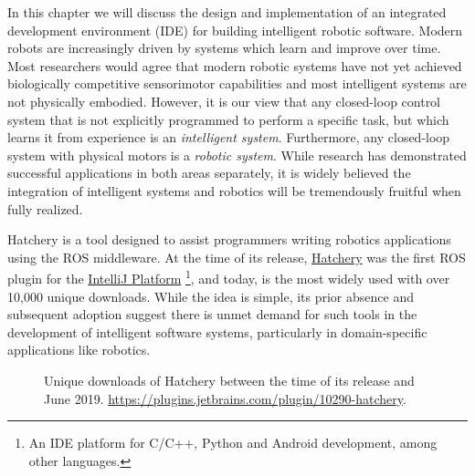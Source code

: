 \documentclass[12pt,initial,twoside,maitrise]{dms}
\numberwithin{equation}{section}
\numberwithin{table}{chapter}
\numberwithin{figure}{chapter}
\begin{document}
In this chapter we will discuss the design and implementation of an integrated development environment (IDE) for building intelligent robotic software. Modern robots are increasingly driven by systems which learn and improve over time. Most researchers would agree that modern robotic systems have not yet achieved biologically competitive sensorimotor capabilities and most intelligent systems are not physically embodied. However, it is our view that any closed-loop control system that is not explicitly programmed to perform a specific task, but which learns it from experience is an \textit{intelligent system}. Furthermore, any closed-loop system with physical motors is a \textit{robotic system}. While research has demonstrated successful applications in both areas separately, it is widely believed the integration of intelligent systems and robotics will be tremendously fruitful when fully realized.

Hatchery is a tool designed to assist programmers writing robotics applications using the ROS middleware. At the time of its release, \href{https://github.com/duckietown/hatchery}{Hatchery} was the first ROS plugin for the \href{http://www.jetbrains.org/intellij/sdk/docs}{IntelliJ Platform} \footnote{An IDE platform for C/C++, Python and Android development, among other languages.}, and today, is the most widely used with over 10,000 unique downloads. While the idea is simple, its prior absence and subsequent adoption suggest there is unmet demand for such tools in the development of intelligent software systems, particularly in domain-specific applications like robotics.
%

\begin{figure}
\centering
{}
\caption{Unique downloads of Hatchery between the time of its release and June 2019. \url{https://plugins.jetbrains.com/plugin/10290-hatchery}.}
\label{fig:hatchery_downloads}
\end{figure}
%
\end{document}

